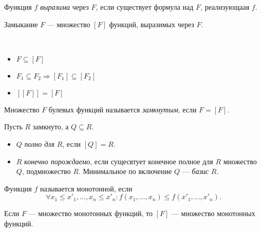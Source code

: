 \documentclass[12pt,a4paper]{article}
\begin{document}
    \begin{definition}
        Функция $f$ \emph{выразима} через $F$, если существует формула над $F$, реализующаая $f$.
    \end{definition}

    \begin{definition}
        Замыкание $F$ --- множество $[F]$ функций, выразимых через $F$. 
    \end{definition}

    \begin{statement}\ 
        \begin{itemize}
            \item $F \subseteq [F]$
            \item $F_1 \subseteq F_2 \Rightarrow [F_1] \subseteq [F_2]$
            \item $[[F]] = [F]$
        \end{itemize}
    \end{statement}

    \begin{definition}
        Множество $F$ булевых функций называется \emph{замкнутым}, если $F = [F]$.
    \end{definition}

    \begin{definition}
        Пусть $R$ замкнуто, а $Q\subseteq R$.
        \begin{itemize}
            \item $Q$ \emph{полно для} $R$, если $[Q] = R$.
            \item $R$ \emph{конечно порождаемо}, если сущесвтует конечное полное для $R$ множество $Q$, подмножество $R$. Минимальное по включение $Q$ --- \emph{базис} $R$.
        \end{itemize}
    \end{definition}

    \begin{definition}
        Функция $f$ называется монотонной, если \[\forall x_1 \leqslant x'_1, \dots, x_n \leqslant x'_n : f(x_1, \dots, x_n) \leqslant f(x'_1, \dots, x'_n).\]
    \end{definition}

    \begin{statement}
        Если $F$ --- множество монотонных функций, то $[F]$ --- множество монотонных функций.
    \end{statement}
\end{document}
